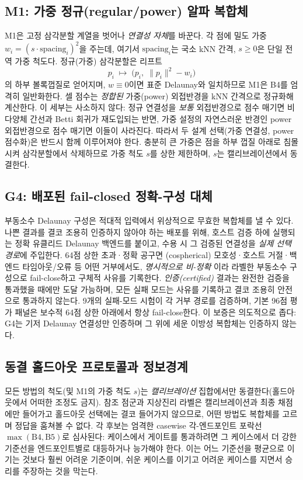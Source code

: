 \documentclass[11pt]{article}
\begin{document}
\subsection{M1: 가중 정규(regular/power) 알파 복합체}\label{sec:m1}
M1은 고정 삼각분할 계열을 벗어나 \emph{연결성 자체}를 바꾼다. 각 점에 밀도 가중
$w_i=(s\cdot \text{spacing}_i)^2$을 주는데, 여기서 $\text{spacing}_i$는 국소 kNN 간격,
$s\ge 0$은 단일 전역 가중 척도다. 정규(가중) 삼각분할은 리프트
\begin{equation}
p_i\;\longmapsto\;\big(p_i,\;\lVert p_i\rVert^2-w_i\big)
\label{eq:lift}
\end{equation}
의 하부 볼록껍질로 얻어지며, $w\equiv 0$이면 표준 Delaunay와 일치하므로 M1은 B4를 엄격히
일반화한다. 셀 점수는 \emph{정합된} 가중(power) 외접반경을 kNN 간격으로 정규화해 계산한다.
이 세부는 사소하지 않다: 정규 연결성을 \emph{보통} 외접반경으로 점수 매기면 비다양체 간선과
Betti 회귀가 재도입되는 반면, 가중 설정의 자연스러운 반경인 power 외접반경으로 점수 매기면 이들이
사라진다. 따라서 두 설계 선택(가중 연결성, power 점수화)은 반드시 함께 이루어져야 한다. 충분히 큰
가중은 점을 하부 껍질 아래로 침몰시켜 삼각분할에서 삭제하므로 가중 척도 $s$를 상한 제한하며,
$s$는 캘리브레이션에서 동결한다.

\subsection{G4: 배포된 fail-closed 정확-구성 대체}
부동소수 Delaunay 구성은 적대적 입력에서 위상적으로 무효한 복합체를 낼 수 있다. 나쁜 결과를 결코
조용히 인증하지 않아야 하는 배포를 위해, 호스트 검증 하에 실행되는 정확 유클리드 Delaunay 백엔드를
붙이고, 수용 시 그 검증된 연결성을 \emph{실제 선택 경로}에 주입한다. 64점 상한 초과·정확 공구면
(cospherical) 모호성·호스트 거절·백엔드 타임아웃/오류 등 어떤 거부에서도, \emph{명시적으로 비-정확}
이라 라벨한 부동소수 구성으로 fail-close하고 구체적 사유를 기록한다. \emph{인증(certified)} 결과는
완전한 검증을 통과했을 때에만 도달 가능하며, 모든 실패 모드는 사유를 기록하고 결코 조용히 안전으로
통과하지 않는다. 9개의 실패-모드 시험이 각 거부 경로를 검증하며, 기본 96점 평가 패널은 보수적
64점 상한 아래에서 항상 fail-close한다. 이 보증은 의도적으로 좁다: G4는 기저 Delaunay 연결성만
인증하며 그 위에 세운 이방성 복합체는 인증하지 않는다.

\subsection{동결 홀드아웃 프로토콜과 정보경계}
모든 방법의 척도(및 M1의 가중 척도 $s$)는 \emph{캘리브레이션} 집합에서만 동결한다(홀드아웃에서
어떠한 조정도 금지). 참조 점군과 지상진리 라벨은 캘리브레이션과 최종 채점에만 들어가고 홀드아웃
선택에는 결코 들어가지 않으므로, 어떤 방법도 복합체를 고르며 정답을 훔쳐볼 수 없다. 각 후보는
엄격한 casewise 각-엔드포인트 포락선 $\max(\text{B4},\text{B5})$로 심사된다: 케이스에서 게이트를
통과하려면 그 케이스에서 더 강한 기준선을 엔드포인트별로 대등하거나 능가해야 한다. 이는 어느
기준선을 평균으로 이기는 것보다 훨씬 어려운 기준이며, 쉬운 케이스를 이기고 어려운 케이스를 지면서
승리를 주장하는 것을 막는다.
\end{document}
